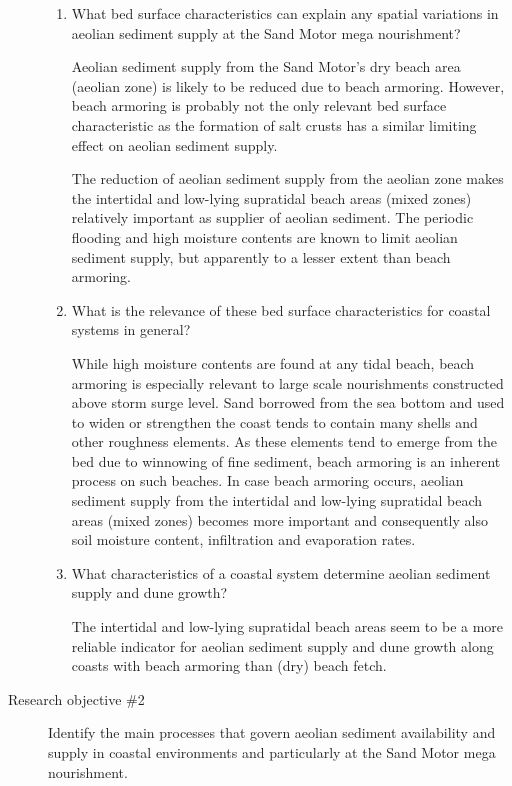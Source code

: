 \begin{description}
\begin{enumerate}[{1.}1]
  \item What bed surface characteristics can explain any spatial
    variations in aeolian sediment supply at the Sand Motor mega
    nourishment?

    Aeolian sediment supply from the Sand Motor's dry beach area
    (aeolian zone) is likely to be reduced due to beach
    armoring. However, beach armoring is probably not the only
    relevant bed surface characteristic as the formation of salt
    crusts has a similar limiting effect on aeolian sediment
    supply.

    The reduction of aeolian sediment supply from the aeolian zone
    makes the intertidal and low-lying supratidal beach areas (mixed
    zones) relatively important as supplier of aeolian sediment. The
    periodic flooding and high moisture contents are known to limit
    aeolian sediment supply, but apparently to a lesser extent than
    beach armoring.

  \item What is the relevance of these bed surface characteristics for
    coastal systems in general?

    While high moisture contents are found at any tidal beach, beach
    armoring is especially relevant to large scale nourishments
    constructed above storm surge level.%
    Sand borrowed from
    the sea bottom and used to widen or strengthen the coast tends to
    contain many shells and other roughness elements. As these
    elements tend to emerge from the bed due to winnowing of fine
    sediment, beach armoring is an inherent process on such
    beaches. In case beach armoring occurs, aeolian sediment supply
    from the intertidal and low-lying supratidal beach areas (mixed
    zones) becomes more important and consequently also soil moisture
    content, infiltration and evaporation rates.

  \item What characteristics of a coastal system determine aeolian
    sediment supply and dune growth?

    The intertidal and low-lying supratidal beach areas seem to be a
    more reliable indicator for aeolian sediment supply and dune
    growth along coasts with beach armoring than (dry) beach
    fetch.
  
  \end{enumerate}

  \bigskip

\item[Research objective \#2] Identify the main processes that govern
  aeolian sediment availability and supply in coastal environments and
  particularly at the Sand Motor mega nourishment.


\end{description}

